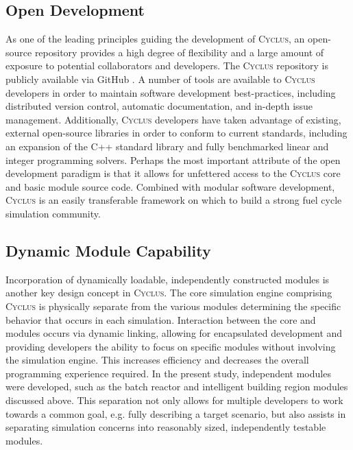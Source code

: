 \documentclass{anstrans}
\begin{document}
\subsection{Open Development}
As one of the leading principles guiding the development of
\textsc{Cyclus}, an open-source repository provides a high degree of
flexibility and a large amount of exposure to potential collaborators
and developers. The \textsc{Cyclus} repository is publicly available via
GitHub \cite{cyclus2012}. A number of tools are available to
\textsc{Cyclus} developers in order to maintain software development
best-practices, including distributed version control, automatic
documentation, and in-depth issue management. Additionally,
\textsc{Cyclus} developers have taken advantage of existing, external
open-source libraries in order to conform to current standards,
including an expansion of the C++ standard library and fully
benchmarked linear and integer programming solvers. Perhaps the most
important attribute of the open development paradigm is that it allows
for unfettered access to the \textsc{Cyclus} core and basic module
source code. Combined with modular software development, \textsc{Cyclus}
is an easily transferable framework on which to build a strong fuel
cycle simulation community.

\subsection{Dynamic Module Capability}
Incorporation of dynamically loadable, independently constructed
modules is another key design concept in \textsc{Cyclus}. The core
simulation engine comprising \textsc{Cyclus} is physically separate from
the various modules determining the specific behavior that occurs in
each simulation.  Interaction between the core and modules occurs via
dynamic linking, allowing for encapsulated development and providing
developers the ability to focus on specific modules without involving
the simulation engine. This increases efficiency and decreases the
overall programming experience required. In the present study,
independent modules were developed, such as the batch reactor and
intelligent building region modules discussed above. This separation
not only allows for multiple developers to work towards a common goal,
e.g. fully describing a target scenario, but also assists in
separating simulation concerns into reasonably sized, independently
testable modules.

\end{document}
